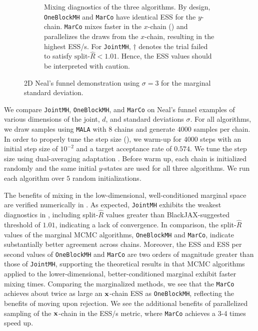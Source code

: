 \documentclass[onefignum,onetabnum]{siamonline250211}
\newcommand{\bfx}{{\bf x}}
\newcommand{\MarCo}{\textnormal{\texttt{MarCo}}\xspace}
\newcommand{\Joint}{\textnormal{\texttt{JointMH}}\xspace}
\newcommand{\OneblockMCMC}{\textnormal{\texttt{OneBlockMH}}\xspace}
\begin{document}
\begin{figure}[!htb]
\begin{subfigure}{\linewidth}
\caption{Mixing diagnostics of the three algorithms.
By design, \OneblockMCMC and \MarCo have identical ESS for the $y$-chain.
\MarCo mixes faster in the $x$-chain () and parallelizes the draws from the $x$-chain, resulting in the highest ESS/s. 
For \Joint, $\dagger$ denotes the trial failed to satisfy $\text{split-$\hat R$} < 1.01$. Hence, the ESS values should be interpreted with caution.}
\label{tab:devils_funnel_metrics}
\end{subfigure}

\caption{2D Neal's funnel demonstration using $\sigma = 3$ for the marginal standard deviation.}
\label{fig:devils_funnel}
\end{figure}

We compare \Joint, \OneblockMCMC, and \MarCo on Neal's funnel examples of various dimensions of the joint, $d$, and standard deviations $\sigma$.
For all algorithms, we draw samples using {\tt MALA}  with $8$ chains and generate $4000$ samples per chain.
In order to properly tune the step size (), we warm-up for $4000$ steps with an initial step size of $10^{-2}$ and a target acceptance rate of $0.574$.
We tune the step size using dual-averaging adaptation \cite[Section 3.2.1]{hoffman_no-u-turn_2014}.
Before warm up, each chain is initialized randomly and the same initial $y$-states are used for all three algorithms.
We run each algorithm over $5$ random initializations.


The benefits of mixing in the low-dimensional, well-conditioned marginal space are verified numerically in .
As expected, \Joint exhibits the weakest diagnostics in , including split-$\hat{R}$ values greater than BlackJAX-suggested threshold of $1.01$, indicating a lack of convergence.
In comparison, the split-$\hat R$ values of the marginal MCMC algorithms, \OneblockMCMC and \MarCo, indicate substantially better agreement across chains.
Moreover, the ESS and ESS per second values of \OneblockMCMC and \MarCo are two orders of magnitude greater than those of \Joint, supporting the theoretical results in  that MCMC algorithms applied to the lower-dimensional, better-conditioned marginal exhibit faster mixing times. 
Comparing the marginalized methods, we see that the \MarCo achieves about twice as large an $\bfx$-chain ESS as \OneblockMCMC, reflecting the benefits of moving upon rejection. 
We see the additional benefits of parallelized sampling of the $\bfx$-chain in the ESS/s metric, where \MarCo achieves a 3-4 times speed up. 
%
%
%
%
\end{document}
